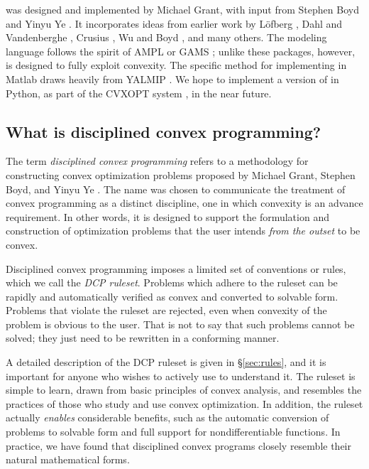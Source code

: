 \documentclass[12pt]{article}
\begin{document}
\cvx was designed and implemented by Michael Grant, with input
from Stephen Boyd and Yinyu Ye \cite{GBY}. It
incorporates ideas from earlier work by 
L\"{o}fberg \cite{YALMIP}, 
Dahl and Vandenberghe \cite{CVXOPT}, 
Crusius \cite{Cru:02}, 
Wu and Boyd \cite{SDPSOL},
and many others.
The modeling language follows
the spirit of AMPL \cite{AMPL} or GAMS \cite{GAMS}; unlike
these packages, however, \cvx is designed to fully exploit convexity.
The specific method for implementing \cvx in Matlab
draws heavily from YALMIP \cite{YALMIP}.
We hope to implement a version of \cvx in Python,
as part of the CVXOPT system \cite{CVXOPT}, in the near future.

\subsection{What is disciplined convex programming?}
\label{sec:what-is-dcp}

The term \emph{disciplined convex programming} refers to
a methodology for constructing convex optimization problems
proposed by Michael Grant, Stephen Boyd, and Yinyu Ye \cite{GBY,Gra:04}.
The name was chosen to communicate the treatment of convex
programming as a distinct discipline, one in which convexity is an
advance requirement. 
In other words, it is designed to support the formulation and
construction of optimization problems that the user 
intends \emph{from the outset} to be convex.

Disciplined convex programming imposes a limited
set of conventions or rules, which we call the \emph{DCP ruleset}.
Problems which adhere to the ruleset can be rapidly and automatically
verified as convex and converted to solvable form.
Problems that violate the ruleset are rejected, even when
convexity of the problem is obvious to the user.
That is not to say that such problems cannot be solved; they
just need to be rewritten in a conforming manner.

A detailed description of the DCP ruleset is given in \S\ref{sec:rules},
and it is important for anyone who wishes to actively use
\cvx to understand it.
The ruleset is simple 
to learn, drawn from basic principles of convex analysis,
and resembles the practices of those who study and use
convex optimization. In addition, the ruleset actually \emph{enables}
considerable benefits, such as the automatic conversion of
problems to solvable
form and full support for nondifferentiable
functions. In practice, we have found that
disciplined convex programs closely resemble
their natural mathematical forms.
\end{document}
